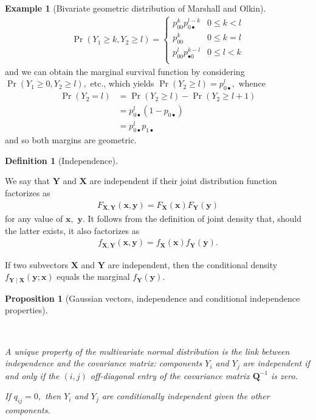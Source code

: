 \documentclass[
  11pt,
  letterpaper,
]{scrbook}
\theoremstyle{definition}
\newtheorem{example}{Example}[chapter]
\theoremstyle{plain}
\newtheorem{proposition}{Proposition}[chapter]
\theoremstyle{plain}
\theoremstyle{plain}
\theoremstyle{definition}
\theoremstyle{definition}
\newtheorem{definition}{Definition}[chapter]
\theoremstyle{plain}
\newtheorem{proposition}{Proposition}[chapter]
\theoremstyle{plain}
\theoremstyle{remark}
\begin{document}
\begin{example}[Bivariate geometric distribution of Marshall and
Olkin]
\begin{align*}
\Pr(Y_1 \ge k, Y_2 \ge l) = \begin{cases}
p_{00}^k p_{0 \bullet}^{l-k} & 0\leq k < l\\
p_{00}^k & 0 \leq k=l \\
p_{00}^l p_{\bullet 0}^{k-l} & 0\leq l < k\\
\end{cases}
\end{align*} and we can obtain the marginal survival function by
considering \(\Pr(Y_1 \ge 0, Y_2 \ge l),\) etc., which yields
\(\Pr(Y_2 \ge l) = p_{0 \bullet}^{l},\) whence \begin{align*}
\Pr(Y_2 = l) &= \Pr(Y_2 \ge l) -\Pr(Y_2 \ge l+1)
\\&= p_{0 \bullet}^{l} (1-p_{0 \bullet})
 \\&=p_{0 \bullet}^{l}p_{1\bullet}
\end{align*} and so both margins are geometric.

\end{example}

\begin{definition}[Independence]\protect\hypertarget{def-independence}{}\label{def-independence}

We say that \(\boldsymbol{Y}\) and \(\boldsymbol{X}\) are independent if
their joint distribution function factorizes as \begin{align*}
F_{\boldsymbol{X}, \boldsymbol{Y}}(\boldsymbol{x}, \boldsymbol{y}) = F_{\boldsymbol{X}}(\boldsymbol{x})F_{\boldsymbol{Y}}(\boldsymbol{y})
\end{align*} for any value of \(\boldsymbol{x},\) \(\boldsymbol{y}.\) It
follows from the definition of joint density that, should the latter
exists, it also factorizes as \begin{align*}
f_{\boldsymbol{X}, \boldsymbol{Y}}(\boldsymbol{x}, \boldsymbol{y}) = f_{\boldsymbol{X}}(\boldsymbol{x})f_{\boldsymbol{Y}}(\boldsymbol{y}).
\end{align*}

If two subvectors \(\boldsymbol{X}\) and \(\boldsymbol{Y}\) are
independent, then the conditional density
\(f_{\boldsymbol{Y} \mid \boldsymbol{X}}(\boldsymbol{y}; \boldsymbol{x})\)
equals the marginal \(f_{\boldsymbol{Y}}(\boldsymbol{y}).\)

\end{definition}

\begin{proposition}[Gaussian vectors, independence and conditional
independence
properties]\protect\hypertarget{prp-independence}{}\label{prp-independence}

~

A unique property of the multivariate normal distribution is the link
between independence and the covariance matrix: components \(Y_i\) and
\(Y_j\) are independent if and only if the \((i,j)\) off-diagonal entry
of the covariance matrix \(\boldsymbol{Q}^{-1}\) is zero.

If \(q_{ij}=0,\) then \(Y_i\) and \(Y_j\) are conditionally independent
given the other components.

\end{proposition}
\end{document}
